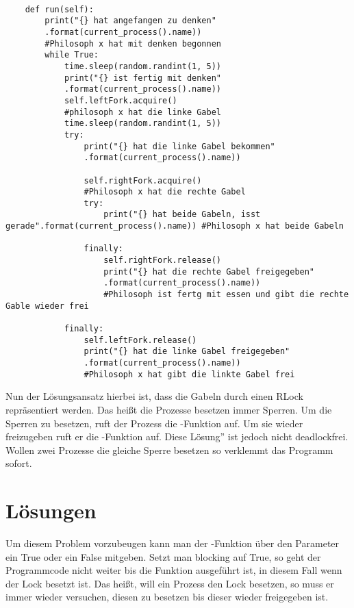 \begin{lstlisting}[style = Python, label = {erste Lösung}, caption = {erste Lösung}]

    def run(self):
        print("{} hat angefangen zu denken"
        .format(current_process().name)) 
        #Philosoph x hat mit denken begonnen
        while True:
            time.sleep(random.randint(1, 5))
            print("{} ist fertig mit denken"
            .format(current_process().name))
            self.leftFork.acquire() 
            #philosoph x hat die linke Gabel
            time.sleep(random.randint(1, 5))
            try:
                print("{} hat die linke Gabel bekommen"
                .format(current_process().name))

                self.rightFork.acquire() 
                #Philosoph x hat die rechte Gabel
                try:
                    print("{} hat beide Gabeln, isst gerade".format(current_process().name)) #Philosoph x hat beide Gabeln

                finally:
                    self.rightFork.release()
                    print("{} hat die rechte Gabel freigegeben"
                    .format(current_process().name)) 
                    #Philosoph ist fertg mit essen und gibt die rechte Gable wieder frei

            finally:
                self.leftFork.release()
                print("{} hat die linke Gabel freigegeben"
                .format(current_process().name)) 
                #Philosoph x hat gibt die linkte Gabel frei

\end{lstlisting}

Nun der Lösungsansatz hierbei ist, dass die Gabeln durch einen RLock repräsentiert werden. Das heißt die Prozesse besetzen immer Sperren. Um die Sperren zu besetzen, ruft der Prozess die -Funktion auf. Um sie wieder freizugeben ruft er die -Funktion auf. Diese \glqq Lösung'' ist jedoch nicht deadlockfrei. Wollen zwei Prozesse die gleiche Sperre besetzen so verklemmt das Programm sofort. 

\section{Lösungen}
\label{endlösung}

Um diesem Problem vorzubeugen kann man der -Funktion über den Parameter  ein True oder ein False mitgeben. Setzt man blocking auf True, so geht der Programmcode nicht weiter bis die Funktion ausgeführt ist, in diesem Fall wenn der Lock besetzt ist. Das heißt, will ein Prozess den Lock besetzen, so muss er immer wieder versuchen, diesen zu besetzen bis dieser wieder freigegeben ist. 

